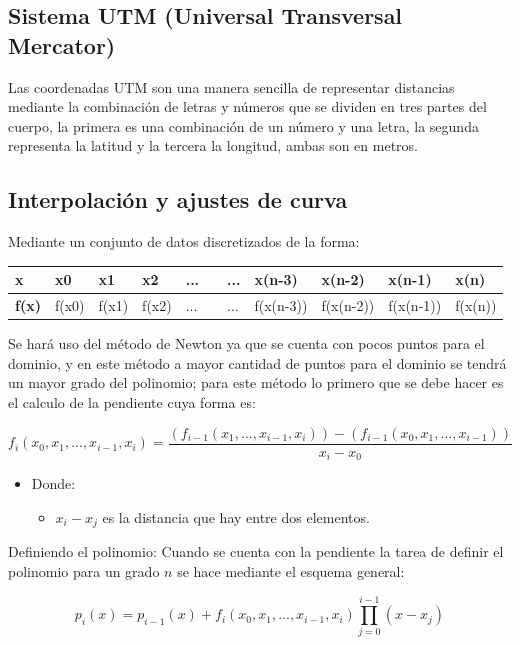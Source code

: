 \documentclass[12pt,a4paper]{report}
\begin{document}
\subsection{Sistema UTM (Universal Transversal Mercator)}
Las coordenadas UTM son una manera sencilla de representar distancias mediante la combinación de letras y números que se dividen en tres partes del cuerpo, la primera es una combinación de un número y una letra, la segunda representa la latitud y la tercera la longitud, ambas son en metros.

\subsection{Interpolación y ajustes de curva}
Mediante un conjunto de datos discretizados de la forma:

\begin{table}[h]
\begin{tabular}{|l|l|l|l|l|l|l|l|l|l|l|}
\hline
\textbf{x}    & x0    & x1    & x2    & ... &  & ... & x(n-3)    & x(n-2)    & x(n-1)    & x(n)    \\ \hline
\textbf{f(x)} & f(x0) & f(x1) & f(x2) & ... &  & ... & f(x(n-3)) & f(x(n-2)) & f(x(n-1)) & f(x(n)) \\ \hline
\end{tabular}
\end{table}


Se hará uso del método de Newton ya que se cuenta con pocos puntos para el dominio, y en este método a mayor cantidad de puntos para el dominio se tendrá un mayor grado del polinomio; para este método lo primero que se debe hacer es el calculo de la pendiente cuya forma es:

$$ f_{i}(x_{0}, x_{1}, ... , x_{i-1}, x_{i}) = \frac{(f_{i-1}(x_{1}, ... , x_{i-1}, x_{i})) - (f_{i-1}(x_{0}, x_{1}, ... , x_{i-1}) )}{x_{i} - x_{0}} $$

\begin{itemize}
\item Donde:
	\begin{itemize}
	\item $ x_{i} - x_{j} $ es la distancia que hay entre dos elementos.
	\end{itemize}
\end{itemize}

Definiendo el polinomio:
Cuando se cuenta con la pendiente la tarea de definir el polinomio para un grado $n$ se hace mediante el esquema general:

$$ p_{i}(x) = p_{i-1}(x) + f_{i}(x_{0}, x_{1}, ... , x_{i-1}, x_{i})\prod_{j=0}^{i-1}(x-x_{j}) $$
\end{document}
